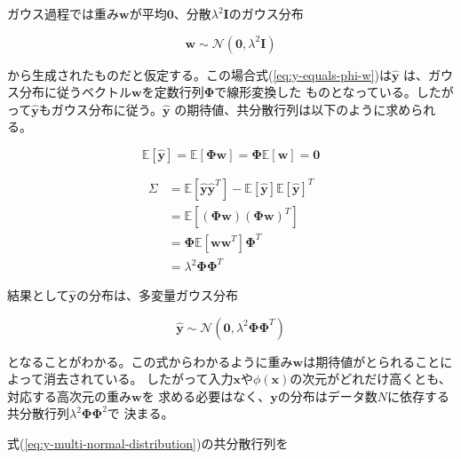 ガウス過程では重み$\boldsymbol{w}$が平均$\boldsymbol{0}$、分散$\lambda^2\boldsymbol{I}$のガウス分布

\begin{equation}
\boldsymbol{w} \sim \mathcal{N}(\boldsymbol{0}, \lambda^2\boldsymbol{I})
\end{equation}

から生成されたものだと仮定する。この場合式(\ref{eq:y-equals-phi-w})は$\boldsymbol{\hat{y}}$
は、ガウス分布に従うベクトル$\boldsymbol{w}$を定数行列$\boldsymbol{\Phi}$で線形変換した
ものとなっている。したがって$\boldsymbol{\hat{y}}$もガウス分布に従う。$\boldsymbol{\hat{y}}$
の期待値、共分散行列は以下のように求められる。

\begin{equation}
\mathbb{E}[\boldsymbol{\hat{y}}] = \mathbb{E}[\boldsymbol{\Phi}\boldsymbol{w}] = \boldsymbol{\Phi}\mathbb{E}[\boldsymbol{w}] = \boldsymbol{0}
\end{equation}

\begin{equation}
\begin{split}
\Sigma &= \mathbb{E}[\boldsymbol{\hat{y}}\boldsymbol{\hat{y}}^T] - \mathbb{E}[\boldsymbol{\hat{y}}]\mathbb{E}[\boldsymbol{\hat{y}}]^T \\
	   &= \mathbb{E}[(\boldsymbol{\Phi}\boldsymbol{w})(\boldsymbol{\Phi}\boldsymbol{w})^T] \\
	   &= \boldsymbol{\Phi}\mathbb{E}[\boldsymbol{w}\boldsymbol{w}^T]\boldsymbol{\Phi}^T \\
	   &= \lambda^2\boldsymbol{\Phi}\boldsymbol{\Phi}^T
\end{split}
\end{equation}

結果として$\boldsymbol{\hat{y}}$の分布は、多変量ガウス分布

\begin{equation}\label{eq:y-multi-normal-distribution}
\boldsymbol{\hat{y}} \sim \mathcal{N}(\boldsymbol{0}, \lambda^2\boldsymbol{\Phi}\boldsymbol{\Phi}^T)
\end{equation}

となることがわかる。この式からわかるように重み$\boldsymbol{w}$は期待値がとられることによって消去されている。
したがって入力$\boldsymbol{x}$や$\phi(\boldsymbol{x})$の次元がどれだけ高くとも、対応する高次元の重み$\boldsymbol{w}$を
求める必要はなく、$\boldsymbol{y}$の分布はデータ数$N$に依存する共分散行列$\lambda^2\boldsymbol{\Phi}\boldsymbol{\Phi}^2$で
決まる。

式(\ref{eq:y-multi-normal-distribution})の共分散行列を

